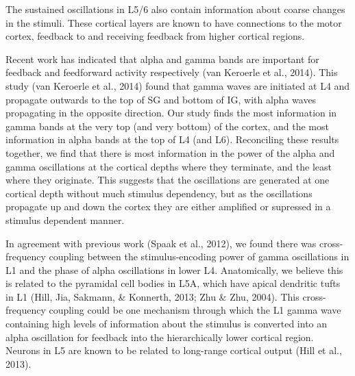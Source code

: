 The sustained oscillations in \acs{L5}/6 also contain information about coarse changes in the stimuli.
These cortical layers are known to have connections to the motor cortex, feedback to  and receiving feedback from higher cortical regions.


Recent work has indicated that alpha and gamma bands are important for feedback and feedforward activity respectively (van Keroerle et al., 2014).
This study (van Keroerle et al., 2014) found that gamma waves are initiated at \ac{L4} and propagate outwards to the top of \ac{SG} and bottom of \ac{IG}, with alpha waves propagating in the opposite direction.
Our study finds the most information in gamma bands at the very top (and very bottom) of the cortex, and the most information in alpha bands at the top of \ac{L4} (and \ac{L6}).
Reconciling these results together, we find that there is most information in the power of the alpha and gamma oscillations at the cortical depths where they terminate, and the least where they originate.
This suggests that the oscillations are generated at one cortical depth without much stimulus dependency, but as the oscillations propagate up and down the cortex they are either amplified or supressed in a stimulus dependent manner.

In agreement with previous work (Spaak et al., 2012), we found there was cross-frequency coupling between the stimulus-encoding power of gamma oscillations in \ac{L1} and the phase of alpha oscillations in lower \ac{L4}.
Anatomically, we believe this is related to the pyramidal cell bodies in \ac{L5A}, which have apical dendritic tufts in \ac{L1} (Hill, Jia, Sakmann, \& Konnerth, 2013; Zhu \& Zhu, 2004).
This cross-frequency coupling could be one mechanism through which the \ac{L1} gamma wave containing high levels of information about the stimulus is converted into an alpha oscillation for feedback into the hierarchically lower cortical region.
Neurons in \ac{L5} are known to be related to long-range cortical output (Hill et al., 2013).


